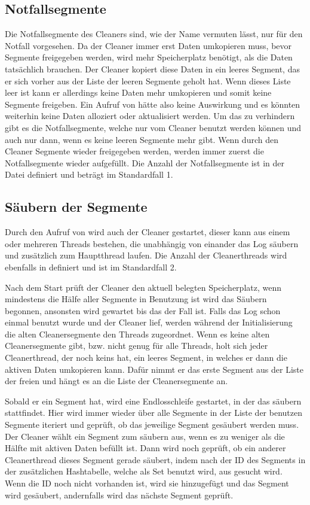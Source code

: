 \documentclass{class/thesis}
\begin{document}
\begin{thesis}
	\subsection{Notfallsegmente}
	Die Notfallsegmente des Cleaners sind, wie der Name vermuten lässt, nur für den Notfall vorgesehen. Da der Cleaner immer erst Daten umkopieren muss, bevor Segmente freigegeben werden, wird mehr Speicherplatz benötigt, als die Daten tatsächlich brauchen. 
	Der Cleaner kopiert diese Daten in ein leeres Segment, das er sich vorher aus der Liste der leeren Segmente geholt hat. Wenn dieses Liste leer ist kann er allerdings keine Daten mehr umkopieren und somit keine Segmente freigeben.
	Ein Aufruf von  hätte also keine Auswirkung und es könnten weiterhin keine Daten alloziert oder aktualisiert werden.
	Um das zu verhindern gibt es die Notfallsegmente, welche nur vom Cleaner benutzt werden können und auch nur dann, wenn es keine leeren Segmente mehr gibt. 
	Wenn durch den Cleaner Segmente wieder freigegeben werden, werden immer zuerst die Notfallsegmente wieder aufgefüllt.
	Die Anzahl der Notfallsegmente ist in der Datei  definiert und beträgt im Standardfall 1.
	
	
	\subsection{Säubern der Segmente}
	
	Durch den Aufruf von  wird auch der Cleaner gestartet, dieser kann aus einem oder mehreren Threads bestehen, die unabhängig von einander das Log säubern und zusätzlich zum Hauptthread laufen. Die Anzahl der Cleanerthreads wird ebenfalls in  definiert und ist im Standardfall 2.
	
	Nach dem Start prüft der Cleaner den aktuell belegten Speicherplatz, wenn mindestens die Hälfe aller Segmente in Benutzung ist wird das Säubern begonnen, ansonsten wird gewartet bis das der Fall ist.
	Falls das Log schon einmal benutzt wurde und der Cleaner lief, werden während der Initialisierung die alten Cleanersegmente den Threads zugeordnet.
	Wenn es keine alten Cleanersegmente gibt, bzw. nicht genug für alle Threads, holt sich jeder Cleanerthread, der noch keins hat, ein leeres Segment, in welches er dann die aktiven Daten umkopieren kann. Dafür nimmt er das erste Segment aus der Liste der freien und hängt es an die Liste der Cleanersegmente an.
	
	Sobald er ein Segment hat, wird eine Endlosschleife gestartet, in der das säubern stattfindet.
	Hier wird immer wieder über alle Segmente in der Liste der benutzen Segmente iteriert und geprüft, ob das jeweilige Segment gesäubert werden muss. Der Cleaner wählt ein Segment zum säubern aus, wenn es zu weniger als die Hälfte mit aktiven Daten befüllt ist.
	Dann wird noch geprüft, ob ein anderer Cleanerthread dieses Segment gerade säubert, indem nach der ID des Segments in der zusätzlichen Hashtabelle, welche als Set benutzt wird, aus  gesucht wird. 
	Wenn die ID noch nicht vorhanden ist, wird sie hinzugefügt und das Segment wird gesäubert, andernfalls wird das nächste Segment geprüft.
	

\end{thesis}
\end{document}
